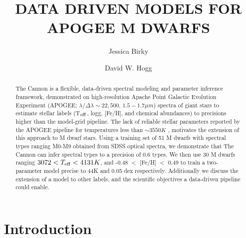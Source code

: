 \documentclass[modern]{aastex62}
\begin{document}
\title{DATA DRIVEN MODELS FOR APOGEE M DWARFS}



\author[0000-0002-7961-6881]{Jessica Birky}

\author[0000-0003-2866-9403]{David W. Hogg}


\begin{abstract}

The Cannon \citep{Ness:2015} is a flexible, data-driven spectral modeling and parameter inference framework, demonstrated on high-resolution Apache Point Galactic Evolution Experiment (APOGEE; $\lambda/\Delta\lambda\sim22,500$, $1.5-1.7 \mu m$) spectra of giant stars to estimate stellar labels (T$_{\rm eff}$, logg, [Fe/H], and chemical abundances) to precisions higher than the model-grid pipeline. The lack of reliable stellar parameters reported by the APOGEE pipeline for temperatures less than $\sim3550K$ \citep{Schmidt:2016}, motivates the extension of this approach to M dwarf stars. Using a training set of 51 M dwarfs with spectral types ranging M0-M9 obtained from SDSS optical spectra, we demonstrate that The Cannon can infer spectral types to a precision of 0.6 types. We then use 30 M dwarfs ranging $3072 < T_{\rm eff} < 4131K$, and -0.48 $<$ [Fe/H] $<$ 0.49 to train a two-parameter model precise to 44K and 0.05 dex respectively. Additionally we discuss the extension of a model to other labels, and the scientific objectives a data-driven pipeline could enable.

\end{abstract}

 
\section{Introduction} \label{sec:intro}
\end{document}
